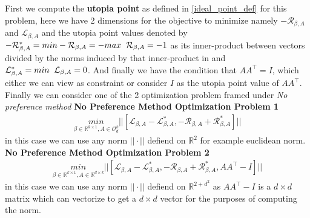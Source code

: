 \newpage
{}
First we compute the \textbf{utopia point} as defined in \ref{ideal_point_def} for this problem, here we have 2 dimensions for the objective to minimize namely $-\mathcal{R}_{\beta, A}$ and $\mathcal{L}_{\beta, A}$ and the utopia point values denoted by $-\mathcal{R}_{\beta, A}^* = min -\mathcal{R}_{\beta, A}  = - max\hspace{2mm} \mathcal{R}_{\beta, A} =  - 1 $ as its inner-product between vectors divided by the norms induced by that inner-product in and $\mathcal{L}_{\beta, A}^* =min \hspace{2mm} \mathcal{L}_{\beta, A} = 0$. And finally we have the condition that $AA^\top = I$, which either we can view as constraint or consider $I$ as the utopia point value of $AA^\top$. Finally we can consider one of the 2 optimization problem framed under \textit{No preference method}
\newline \textbf{No Preference Method Optimization Problem 1}
\begin{equation} \label{NPMOP_1:objective}
\begin{aligned}
    \underset{\beta\in \mathbb{R}^{k\times 1},A\in \mathcal{O}^{k}_{d}}{min} || [\mathcal{L}_{\beta, A}-\mathcal{L}_{\beta, A}^*,-\mathcal{R}_{\beta, A}+\mathcal{R}_{\beta, A}^*]||
\end{aligned}
\end{equation}
in this case we can use any norm $||\cdot ||$ defiend on $\mathbb{R}^2$ for example euclidean norm.
\hspace{2mm}
\newline \textbf{No Preference Method Optimization Problem 2}
\begin{equation} \label{NPMOP_2:objective}
\begin{aligned}
    \underset{\beta\in \mathbb{R}^{k\times 1},A\in \mathbb{R}^{d\times k}}{min} || [\mathcal{L}_{\beta, A}-\mathcal{L}_{\beta, A}^*,-\mathcal{R}_{\beta, A}+\mathcal{R}_{\beta, A}^*, AA^\top - I]||
\end{aligned}
\end{equation}
in this case we can use any norm $||\cdot ||$ defiend on $\mathbb{R}^{2+d^2}$ as $AA^\top -I$ is a $d\times d$ matrix which can vectorize to get a $d\times d$ vector for the purposes of computing the norm.

